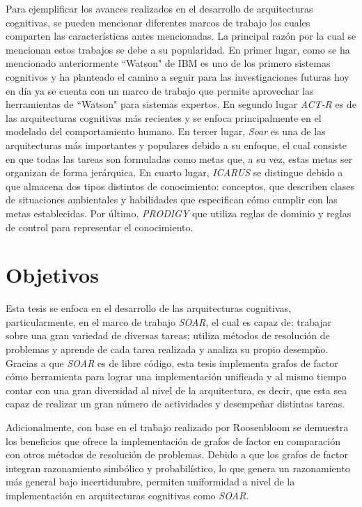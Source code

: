 Para ejemplificar los avances realizados en el desarrollo de arquitecturas cognitivas, se pueden mencionar diferentes marcos de trabajo los cuales comparten las caracter\'{i}sticas antes mencionadas. La principal raz\'{o}n por la cual se mencionan estos trabajos se debe a su popularidad. En primer lugar, como se ha mencionado anteriormente “Watson" de IBM es uno de los primero sistemas cognitivos y ha planteado el camino a seguir para las investigaciones futuras hoy en d\'{i}a ya se cuenta con un marco de trabajo que permite aprovechar las herramientas de “Watson" para sistemas expertos. En segundo lugar \emph{ACT-R} \cite{anderson1997act} es de las arquitecturas cognitivas m\'{a}s recientes y se enfoca principalmente en el modelado del comportamiento humano. En tercer lugar, \emph{Soar} \cite{soar1987} es una de las arquitecturas m\'{a}s importantes y populares debido a su enfoque, el cual consiste en que todas las tareas son formuladas como metas que, a su vez, estas metas ser organizan de forma jer\'{a}rquica. En cuarto lugar, \emph{ICARUS} \cite{langley1991design} se distingue debido a que almacena dos tipos distintos de conocimiento: conceptos, que describen clases de situaciones ambientales y habilidades que especifican c\'{o}mo cumplir con las metas establecidas. Por \'{ultimo}, \emph{PRODIGY} \cite{carbonell1991prodigy} que utiliza reglas de dominio y reglas de control para representar el conocimiento.

\section{Objetivos}

Esta tesis se enfoca en el desarrollo de las arquitecturas cognitivas, particularmente, en el marco de trabajo \emph{SOAR}, el cual es capaz de: trabajar sobre una gran variedad de diversas tareas; utiliza m\'{e}todos de resoluci\'{o}n de problemas y aprende de cada tarea realizada y analiza su propio desemp\~no. Gracias a que \emph{SOAR} es de libre c\'{o}digo, esta tesis implementa grafos de factor c\'{o}mo herramienta para lograr una implementaci\'{o}n unificada y al mismo tiempo contar con una gran diversidad al nivel de la arquitectura, es decir, que esta sea capaz de realizar un gran n\'{u}mero de actividades y desempe\~nar distintas tareas.

Adicionalmente, con base en el trabajo realizado por Roosenbloom \cite{rosenbloom2009towards} se demuestra los beneficios que ofrece la implementaci\'{o}n de grafos de factor en comparaci\'{o}n con otros m\'{e}todos de resoluci\'{o}n de problemas. Debido a que los grafos de factor integran razonamiento simb\'{o}lico y probabil\'{i}stico, lo que genera un razonamiento m\'{a}s general bajo incertidumbre, permiten uniformidad a nivel de la implementaci\'{o}n en arquitecturas cognitivas como \emph{SOAR}\cite{rosenbloom2009towards}.

